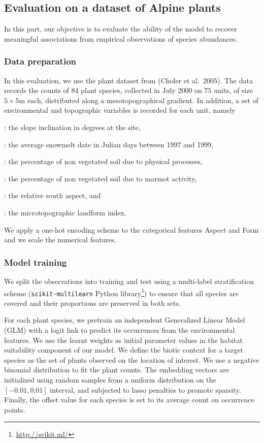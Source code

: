 \documentclass[10pt,a4paper]{article}
\begin{document}


\subsection{Evaluation on a dataset of Alpine plants}
In this part, our objective is to evaluate the ability of the model to recover meaningful associations from empirical observations of species abundances.

\subsubsection{Data preparation}
In this evaluation, we use the plant dataset from (Choler et al.\ 2005). 
The data records the counts of $84$ plant species, collected in July 2000 on $75$ units, of size $5 \times 5$m each, distributed along a mesotopographical gradient. In addition, a set of environmental and topographic variables is recorded for each unit, namely
\begin{description}
  \setlength\itemsep{-.2em}
\item[\trtSlope]: the slope inclination in degrees at the site,
\item[\trtSnow]: the average snowmelt date in Julian days between 1997 and 1999,
\item[\trtPhysD]: the percentage of non vegetated soil due to physical processes,
\item[\trtZoogD]: the percentage of non vegetated soil due to marmot activity,
\item[\trtAspect]: the relative south aspect, and
\item[\trtForm]: the microtopographic landform index.
\end{description}
We apply a one-hot encoding scheme to the categorical features Aspect and Form and we scale the numerical features. 

\subsubsection{Model training}
We split the observations into training and test using a multi-label stratification scheme (\texttt{scikit-multilearn} Python library\footnote{\url{http://scikit.ml/}}) to ensure that all species are covered and their proportions are preserved in both sets. 

For each plant species, we pretrain an independent Generalized Linear Model (GLM) with a logit link to predict its occurrences from the environmental features. We use the learnt weights as initial parameter values in the habitat suitability component of our model. 
We define the biotic context for a target species as the set of plants observed on the location of interest. We use a negative binomial distribution to fit the plant counts. The embedding vectors are initialized using random samples from a uniform distribution on the $[-0.01,0.01]$ interval, and subjected to lasso penalties to promote sparsity. Finally, the offset value for each species is set to its average count on occurrence points.
\end{document}
